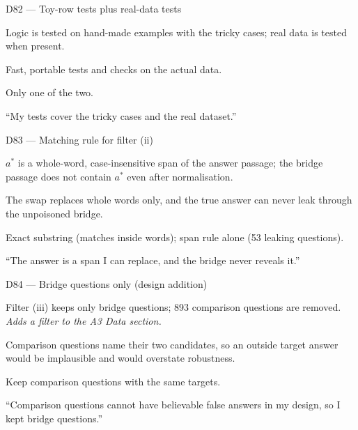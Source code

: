 \documentclass[11pt,a4paper]{report}
\begin{document}
\begin{decisionbox}{D82 --- Toy-row tests plus real-data tests}
\begin{description}[nosep, leftmargin=0pt]
  \item[Decision.] Logic is tested on hand-made examples with the tricky cases; real data is tested when present.
  \item[Why.] Fast, portable tests and checks on the actual data.
  \item[Alternatives.] Only one of the two.
  \item[Interview line.] ``My tests cover the tricky cases and the real dataset.''
\end{description}
\end{decisionbox}

\begin{decisionbox}{D83 --- Matching rule for filter (ii)}
\begin{description}[nosep, leftmargin=0pt]
  \item[Decision.] $a^{*}$ is a whole-word, case-insensitive span of the answer passage; the bridge passage does not contain $a^{*}$ even after normalisation.
  \item[Why.] The swap replaces whole words only, and the true answer can never leak through the unpoisoned bridge.
  \item[Alternatives.] Exact substring (matches inside words); span rule alone (53 leaking questions).
  \item[Interview line.] ``The answer is a span I can replace, and the bridge never reveals it.''
\end{description}
\end{decisionbox}

\begin{decisionbox}{D84 --- Bridge questions only (design addition)}
\begin{description}[nosep, leftmargin=0pt]
  \item[Decision.] Filter (iii) keeps only bridge questions; 893 comparison questions are removed. \emph{Adds a filter to the A3 Data section.}
  \item[Why.] Comparison questions name their two candidates, so an outside target answer would be implausible and would overstate robustness.
  \item[Alternatives.] Keep comparison questions with the same targets.
  \item[Interview line.] ``Comparison questions cannot have believable false answers in my design, so I kept bridge questions.''
\end{description}
\end{decisionbox}
\end{document}
